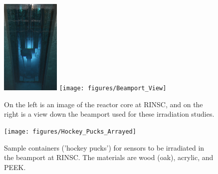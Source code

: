   \begin{figure}[!hbt]
  \begin{center}
    \includegraphics[width=0.25\textwidth]{figures/RINSC_Reactor_Core}
    \texttt{[image: figures/Beamport\_View]}
    \caption{On the left is an image of the reactor core at RINSC, and on the right is a view down the beamport used for these irradiation studies.}
    \label{fig:RINSC_Facility}
  \end{center}
\end{figure}

\begin{figure}[!hbt]
  \begin{center}
    \texttt{[image: figures/Hockey\_Pucks\_Arrayed]}
    \caption{Sample containers ('hockey pucks') for sensors to be irradiated in the beamport at RINSC. The materials are wood (oak), acrylic, and PEEK.}
    \label{fig:Pucks_Arrayed}
  \end{center}
\end{figure}

